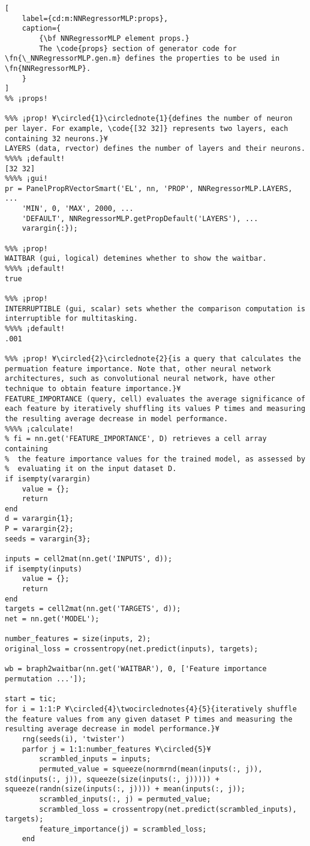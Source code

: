 \documentclass{tufte-handout}
\begin{document}
\begin{lstlisting}[
	label={cd:m:NNRegressorMLP:props},
	caption={
		{\bf NNRegressorMLP element props.}
		The \code{props} section of generator code for \fn{\_NNRegressorMLP.gen.m} defines the properties to be used in \fn{NNRegressorMLP}.
	}
]
%% ¡props!

%%% ¡prop! ¥\circled{1}\circlednote{1}{defines the number of neuron per layer. For example, \code{[32 32]} represents two layers, each containing 32 neurons.}¥
LAYERS (data, rvector) defines the number of layers and their neurons.
%%%% ¡default!
[32 32]
%%%% ¡gui!
pr = PanelPropRVectorSmart('EL', nn, 'PROP', NNRegressorMLP.LAYERS, ...
    'MIN', 0, 'MAX', 2000, ...
    'DEFAULT', NNRegressorMLP.getPropDefault('LAYERS'), ...
    varargin{:});

%%% ¡prop!
WAITBAR (gui, logical) detemines whether to show the waitbar.
%%%% ¡default!
true

%%% ¡prop!
INTERRUPTIBLE (gui, scalar) sets whether the comparison computation is interruptible for multitasking.
%%%% ¡default!
.001

%%% ¡prop! ¥\circled{2}\circlednote{2}{is a query that calculates the permuation feature importance. Note that, other neural network architectures, such as convolutional neural network, have other technique to obtain feature importance.}¥
FEATURE_IMPORTANCE (query, cell) evaluates the average significance of each feature by iteratively shuffling its values P times and measuring the resulting average decrease in model performance.
%%%% ¡calculate!
% fi = nn.get('FEATURE_IMPORTANCE', D) retrieves a cell array containing
%  the feature importance values for the trained model, as assessed by
%  evaluating it on the input dataset D.
if isempty(varargin)
    value = {};
    return
end
d = varargin{1};
P = varargin{2};
seeds = varargin{3};

inputs = cell2mat(nn.get('INPUTS', d));
if isempty(inputs)
    value = {};
    return
end
targets = cell2mat(nn.get('TARGETS', d));
net = nn.get('MODEL');

number_features = size(inputs, 2);
original_loss = crossentropy(net.predict(inputs), targets);

wb = braph2waitbar(nn.get('WAITBAR'), 0, ['Feature importance permutation ...']);

start = tic;
for i = 1:1:P ¥\circled{4}\twocirclednotes{4}{5}{iteratively shuffle the feature values from any given dataset P times and measuring the resulting average decrease in model performance.}¥
    rng(seeds(i), 'twister')
    parfor j = 1:1:number_features ¥\circled{5}¥
        scrambled_inputs = inputs;
        permuted_value = squeeze(normrnd(mean(inputs(:, j)), std(inputs(:, j)), squeeze(size(inputs(:, j))))) + squeeze(randn(size(inputs(:, j)))) + mean(inputs(:, j));
        scrambled_inputs(:, j) = permuted_value;
        scrambled_loss = crossentropy(net.predict(scrambled_inputs), targets);
        feature_importance(j) = scrambled_loss;
    end


\end{lstlisting}
\end{document}
